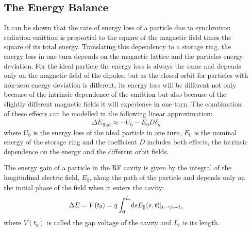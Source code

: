 \documentclass[
	12pt,				%
	openright,			%
	oneside,			%
	a4paper,		%
	chapter=TITLE,		%
	section=TITLE,		%
    brazil,				%
	english,			%
	sumario=tradicional,
	]{abntex2}
\begin{document}
	\subsection{The Energy Balance}

	It can be shown that the rate of energy loss of a particle due to synchrotron radiation emittion is proportial to the square of the magnetic field times the square of its total energy. Translating this dependency to a storage ring, the energy loss in one turn depends on the magnetic lattice and the particles energy deviation. For the ideal particle the energy loss is always the same and depends only on the magnetic field of the dipoles, but as the closed orbit for particles with non-zero energy deviation is different, its energy loss will be different not only because of the intrinsic dependence of the emittion but also because of the slightly different magnetic fields it will experience in one turn. The combination of these effects can be modelled in the following linear approximation:
	\begin{align}\label{eq:radiation_loss}
		\Delta E_\text{Rad} \approx -U_0 - E_0D\delta_n
	\end{align}
	where $U_0$ is the energy loss of the ideal particle in one turn, $E_0$ is the nominal energy of the storage ring and the coefficient $D$ includes both effects, the intrinsic dependence on the energy and the different orbit fields.

	The energy gain of a particle in the RF cavity is given by the integral of the longitudinal electric field, $E_\parallel$, along the path of the particle and depends only on the initial phase of the field when it enters the cavity:
	\begin{align}
		\Delta E = V(t_0) = q\defint{s}{E_\parallel(s,t)|_{t=\sfrac{s}{c}+t_0}}{0}{L_c}
	\end{align}
	where $V(t_0)$ is called the gap voltage of the cavity and $L_c$ is its length.
\end{document}
